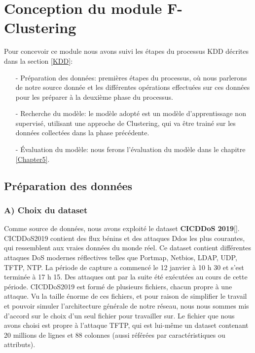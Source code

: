 \newpage
\section{Conception du module F-Clustering}
\label{F-Clustering}
Pour concevoir ce module nous avons suivi les étapes du processus KDD décrites dans la section \ref{KDD}:\\
\begin{itemize}
\item[-] Préparation des données: premières étapes du processus, où nous parlerons de notre source donnée et les différentes opérations effectuées sur ces données pour les préparer à la deuxième phase du processus. \\
\item[-] Recherche du modèle: le modèle adopté est un modèle d'apprentissage non supervisé, utilisant une approche de Clustering, qui va être trainé sur les données collectées dans la phase précédente.\\
\item[-] Évaluation du modèle: nous ferons l'évaluation du modèle dans le chapitre \ref{Chapter5}.
\end{itemize}

\subsection{Préparation des données}
\subsubsection{A) Choix du dataset }
Comme source de données, nous avons exploité le dataset \textbf{ CICDDoS 2019}[\cite{21}]. CICDDoS2019 contient des flux bénins et des attaques Ddos les plus courantes, qui ressemblent aux vraies données du monde réel. Ce dataset contient différentes attaques DoS modernes réflectives telles que Portmap, Netbios, LDAP, UDP, TFTP, NTP. La période de capture a commencé le 12 janvier à 10 h 30 et s’est terminée à 17 h 15. Des attaques ont par la suite été exécutées au cours de cette période.
\newpage
CICDDoS2019 est formé de plusieurs fichiers, chacun propre à une attaque. Vu la taille énorme de ces fichiers, et pour raison de simplifier le travail et pouvoir simuler l'architecture générale de notre réseau, nous nous sommes mis d’accord sur le choix d'un seul fichier pour travailler sur. Le fichier que nous avons choisi est propre à l'attaque TFTP, qui est lui-même un dataset contenant 20 millions de lignes et 88 colonnes (aussi référées par caractéristiques ou attributs).

